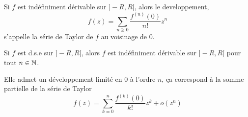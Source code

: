 \documentclass[a4paper, 12pt]{article}
\begin{document}
\begin{definition}
    Si $f$ est indéfiniment dérivable sur $]-R, R[$, alors le developpement,
    $$
    f(z) = \sum_{n \geq 0} \dfrac{f^{(n)}(0)}{n!} z^n
    $$
    s'appelle la série de Taylor de $f$ au voisinage de 0.
\end{definition}

\begin{proposition}{}{}
    Si $f$ est d.s.e sur $]-R, R[$, alors $f$ est indéfiniment dérivable sur $]-R, R[$ pour tout $n \in \mathbb{N}$.

    Elle admet un développement limité en 0 à l'ordre $n$, ça correspond à la somme partielle de la série de Taylor
    $$
    f(z) = \sum_{k = 0}^n \dfrac{f^{(k)}(0)}{k!} z^k + o(z^n)
    $$
\end{proposition}
\end{document}
